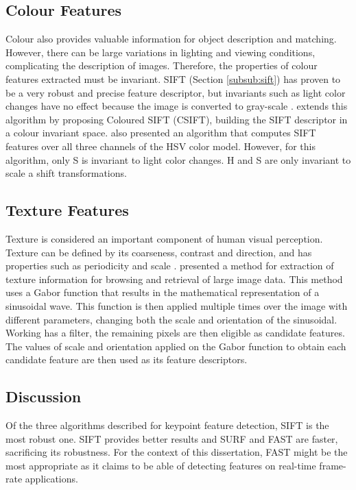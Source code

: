 \subsection{Colour Features}

Colour also provides valuable information for object description and matching. However, there can be large variations in lighting and viewing conditions, complicating the description of images. Therefore, the properties of colour features extracted must be invariant.
SIFT (Section \ref{subsub:sift}) has proven to be a very robust and precise feature descriptor, but invariants such as light color changes have no effect because the image is converted to gray-scale \cite{van2008comparison}. \citeauthor{abdel2006csift} \cite{abdel2006csift} extends this algorithm by proposing Coloured SIFT (CSIFT), building the SIFT descriptor in a colour invariant space.
\citeauthor{bosch2007representing} \cite{bosch2007representing} also presented an algorithm that computes SIFT features over all three channels of the HSV color model. However, for this algorithm, only S is invariant to light color changes. H and S are only invariant to scale a shift transformations.

\subsection{Texture Features}

Texture is considered an important component of human visual perception. Texture can be defined by its coarseness, contrast and direction, and has properties such as periodicity and scale \cite{howarth2004evaluation}.
\citeauthor{manjunath1996texture} \cite{manjunath1996texture} presented a method for extraction of texture information for browsing and retrieval of large image data. This method uses a Gabor function that results in the mathematical representation of a sinusoidal wave. This function is then applied multiple times over the image with different parameters, changing both the scale and orientation of the sinusoidal. Working has a filter, the remaining pixels are then eligible as candidate features. The values of scale and orientation applied on the Gabor function to obtain each candidate feature are then used as its feature descriptors.

\subsection{Discussion}

Of the three algorithms described for keypoint feature detection, SIFT is the most robust one. SIFT provides better results and SURF and FAST are faster, sacrificing its robustness. For the context of this dissertation, FAST might be the most appropriate as it claims to be able of detecting features on real-time frame-rate applications.

